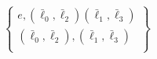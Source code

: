 \documentclass[preview]{standalone}
\begin{document}
\begin{align*}
\begin{Bmatrix}    e,(\bar{\ell}_0,\bar{\ell}_2)(\bar{\ell}_1,\bar{\ell}_3)\\    (\bar{\ell}_0,\bar{\ell}_2),(\bar{\ell}_1,\bar{\ell}_3)\\\end{Bmatrix}
\end{align*}
\end{document}

